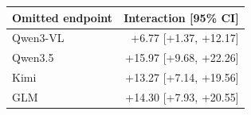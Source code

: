\begin{tabular}{lr}
\toprule
Omitted endpoint & Interaction [95\% CI]\\
\midrule
Qwen3-VL & +6.77 [+1.37, +12.17]\\
Qwen3.5 & +15.97 [+9.68, +22.26]\\
Kimi & +13.27 [+7.14, +19.56]\\
GLM & +14.30 [+7.93, +20.55]\\
\bottomrule
\end{tabular}
